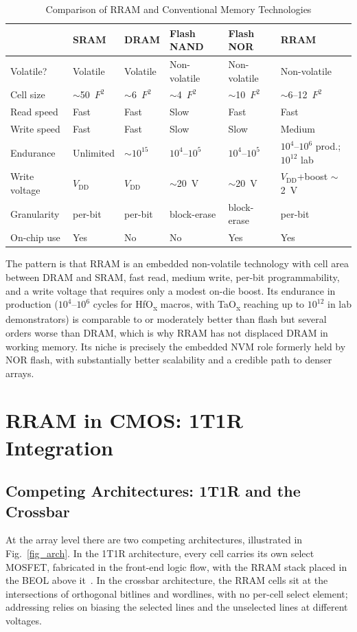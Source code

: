 \documentclass[lettersize,journal]{IEEEtran}
\begin{document}
\begin{table}[!t]
\caption{Comparison of RRAM and Conventional Memory Technologies\label{tab:memory_compare}}
\centering
\footnotesize
\renewcommand{\arraystretch}{1.2}
\begin{tabular}{|p{1.0in}|p{0.7in}|p{0.7in}|p{0.85in}|p{0.85in}|p{1.1in}|}
\hline
 & \textbf{SRAM} & \textbf{DRAM} & \textbf{Flash NAND} & \textbf{Flash NOR} & \textbf{RRAM} \\
\hline
Volatile? & Volatile & Volatile & Non-volatile & Non-volatile & Non-volatile \\
\hline
Cell size & $\sim$50~$F^2$ & $\sim$6~$F^2$ & $\sim$4~$F^2$ & $\sim$10~$F^2$ & $\sim$6--12~$F^2$ \\
\hline
Read speed & Fast & Fast & Slow & Fast & Fast \\
\hline
Write speed & Fast & Fast & Slow & Slow & Medium \\
\hline
Endurance & Unlimited & $\sim$$10^{15}$ & $10^4$--$10^5$ & $10^4$--$10^5$ & $10^4$--$10^6$ prod.; $10^{12}$ lab \\
\hline
Write voltage & $V_\mathrm{DD}$ & $V_\mathrm{DD}$ & $\sim$20~V & $\sim$20~V & $V_\mathrm{DD}$+boost $\sim$2~V \\
\hline
Granularity & per-bit & per-bit & block-erase & block-erase & per-bit \\
\hline
On-chip use & Yes & No & No & Yes & Yes \\
\hline
\end{tabular}
\end{table}

The pattern is that RRAM is an embedded non-volatile technology with cell area between DRAM and SRAM, fast read, medium write, per-bit programmability, and a write voltage that requires only a modest on-die boost. Its endurance in production ($10^4$--$10^6$ cycles for HfO\textsubscript{x} macros, with TaO\textsubscript{x} reaching up to $10^{12}$ in lab demonstrators) is comparable to or moderately better than flash but several orders worse than DRAM, which is why RRAM has not displaced DRAM in working memory. Its niche is precisely the embedded NVM role formerly held by NOR flash, with substantially better scalability and a credible path to denser arrays.

\section{RRAM in CMOS: 1T1R Integration}\label{sec:how}

\subsection{Competing Architectures: 1T1R and the Crossbar}
At the array level there are two competing architectures, illustrated in Fig.~\ref{fig_arch}. In the 1T1R architecture, every cell carries its own select MOSFET, fabricated in the front-end logic flow, with the RRAM stack placed in the BEOL above it~\cite{ref_niu2016}. In the crossbar architecture, the RRAM cells sit at the intersections of orthogonal bitlines and wordlines, with no per-cell select element; addressing relies on biasing the selected lines and the unselected lines at different voltages.
\end{document}
